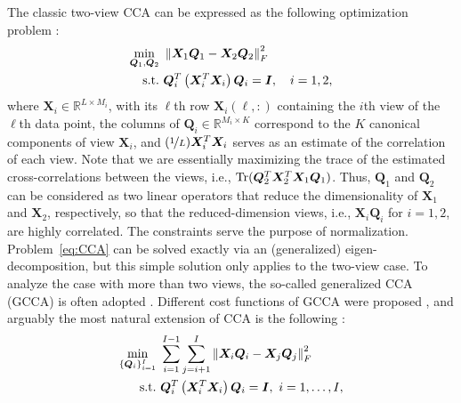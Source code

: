 \documentclass[10pt,journal]{IEEEtran}
\begin{document}
The classic two-view CCA can be expressed as the following optimization problem \cite{hardoon2004canonical}:
\begin{equation}\label{eq:CCA}
\begin{aligned}
    \min_{{\bm Q}_1,{\bm Q}_2} &~\left\|{\bm X}_1{\bm Q}_1-{\bm X}_2{\bm Q}_2\right\|_F^2\\        
                                  {\rm s.t.} &~{\bm Q}_i^T\left({\bm X}_i^T{\bm X}_i\right){\bm Q}_i={\bm I},\quad i=1,2,
\end{aligned}
\end{equation}
where ${\bm X}_i\in\mathbb{R}^{L\times M_i}$, with its $\ell$th row ${\bm X}_i(\ell,:)$ containing the $i$th view of the $\ell$th data point, the columns of ${\bm Q}_i\in\mathbb{R}^{M_i\times K}$ correspond to the $K$ canonical components of view ${\bm X}_i$, and $(\nicefrac{1}{L}){\bm X}_i^T{\bm X}_i$ serves as an estimate of the correlation of each view.
Note that we are essentially maximizing the trace of the estimated cross-correlations between the views, i.e., ${\rm Tr}( \bm{Q}_2^T\bm{X}_2^T\bm{X}_1\bm{Q}_1)$.  Thus, $\bm{Q}_1$ and $\bm{Q}_2$ can be considered as two linear operators that reduce the dimensionality of $\bm{X}_1$ and $\bm{X}_2$, respectively, so that the reduced-dimension views, i.e., $\bm{X}_i\bm{Q}_i$ for $i=1,2$, are highly correlated.
The constraints serve the purpose of normalization.
Problem~\eqref{eq:CCA} can be solved exactly via an (generalized) eigen-decomposition, but this simple solution only applies to the two-view case. To analyze the case with more than two views, the so-called generalized CCA (GCCA) is often adopted \cite{carroll1968generalization}. 
Different cost functions of GCCA were proposed \cite{kettenring1971canonical,tenenhaus2011regularized,carroll1968generalization,tenenhaus2014variable}, and arguably the most natural extension of CCA is the following \cite{hardoon2004canonical}:
\begin{equation}\label{eq:GCCA}
\begin{aligned}
\min_{\{{\bm Q}_i\}_{i=1}^I} &~\sum_{i=1}^{I-1}\sum_{j=i+1}^I\left\|{\bm X}_i{\bm Q}_i-{\bm X}_j{\bm Q}_j\right\|_F^2\\        
{\rm s.t.} &~{\bm Q}_i^T\left({\bm X}_i^T{\bm X}_i\right){\bm Q}_i={\bm I},~i=1,\ldots, I,
\end{aligned}
\end{equation}
\end{document}
